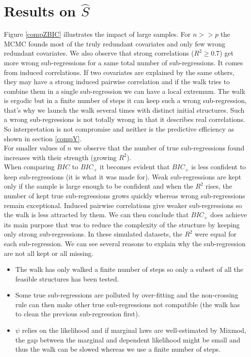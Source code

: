 \documentclass[12pt,a4paper]{report}
\begin{document}
		\section{Results on $\hat S$}	\label{compZ}

Figure \ref{compZBIC} illustrates the impact of large samples. For $n>>p$ the MCMC founds most of the truly redundant covariates and only few wrong redundant covariates. We also observe that strong correlations ($R^2\geq 0.7$) get more wrong sub-regressions for a same total number of sub-regressions. It comes from induced correlations. If two covariates are explained by the same others, they may have a strong induced pairwise correlation and if the walk tries to combine them in a single sub-regression we can have a local extremum. The walk is ergodic but in a finite number of steps it can keep such a wrong sub-regression, that's why we launch the walk several times with distinct initial structures. Such a wrong sub-regressions is not totally wrong in that it describes real correlations. So interpretation is not compromise and neither is the predictive efficiency as shown in section \ref{compY}. \\
For smaller values of $n$ we observe that the number of true sub-regressions found increases with their strength (growing $R^2$).\\
When comparing $BIC$ to $BIC_+$ it becomes evident that $BIC_+$ is less confident to keep sub-regressions (it is what it was made for). Weak sub-regressions are kept only if the sample is large enough to be confident and when the $R^2$ rises, the number of kept true sub-regressions grows quickly whereas wrong sub-regressions remain exceptional. Induced pairwise correlations give weaker sub-regressions so the walk is less attracted by them. We can then conclude that $BIC_+$ does achieve its main purpose that was to reduce the complexity of the structure by keeping only strong sub-regressions. In these simulated datasets, the $R^2$ were equal for each sub-regression. We can see several reasons to explain why the sub-regression are not all kept or all missing. 
\begin{itemize}
	\item The walk has only walked a finite number of steps so only a subset of all the feasible structures has been tested.
	\item Some true sub-regressions are polluted by over-fitting and the non-crossing rule can then make other true sub-regressions not compatible (the walk has to clean the previous sub-regression first).
	\item $\psi$ relies on the likelihood and if marginal laws are well-estimated by Mixmod, the gap between the marginal and dependent likelihood might be small and thus the walk can be slowed whereas we use a finite number of steps.
\end{itemize}
\end{document}
